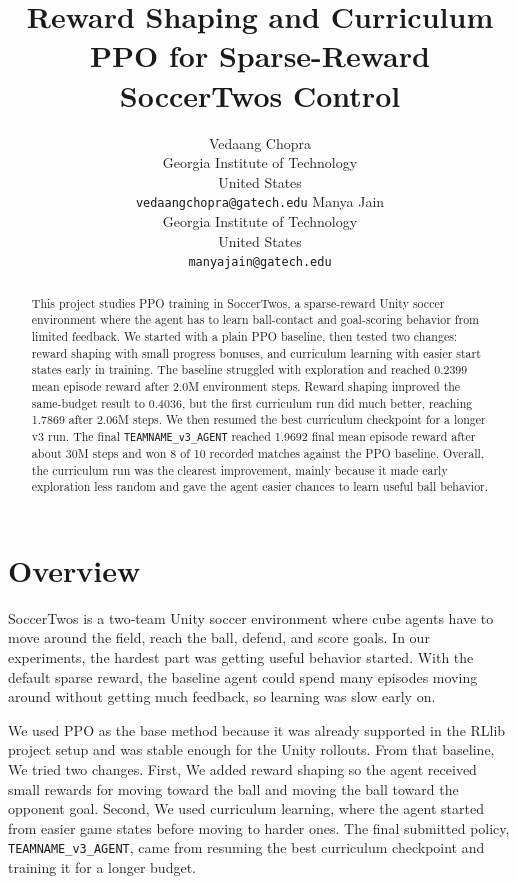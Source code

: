 \documentclass{article}
\title{Reward Shaping and Curriculum PPO for Sparse-Reward SoccerTwos Control}
\author{
  Vedaang Chopra\\
  Georgia Institute of Technology\\
  United States\\
  \texttt{vedaangchopra@gatech.edu}
  \And
  Manya Jain\\
  Georgia Institute of Technology\\
  United States\\
  \texttt{manyajain@gatech.edu}
}
\begin{document}
\maketitle


\begin{abstract}
This project studies PPO training in SoccerTwos, a sparse-reward Unity soccer environment where the agent has to learn ball-contact and goal-scoring behavior from limited feedback. We started with a plain PPO baseline, then tested two changes: reward shaping with small progress bonuses, and curriculum learning with easier start states early in training. The baseline struggled with exploration and reached 0.2399 mean episode reward after 2.0M environment steps. Reward shaping improved the same-budget result to 0.4036, but the first curriculum run did much better, reaching 1.7869 after 2.06M steps. We then resumed the best curriculum checkpoint for a longer v3 run. The final \texttt{TEAMNAME\_v3\_AGENT} reached 1.9692 final mean episode reward after about 30M steps and won 8 of 10 recorded matches against the PPO baseline. Overall, the curriculum run was the clearest improvement, mainly because it made early exploration less random and gave the agent easier chances to learn useful ball behavior.
\end{abstract}



\section{Overview}

SoccerTwos is a two-team Unity soccer environment where cube agents have to move around the field, reach the ball, defend, and score goals. In our experiments, the hardest part was getting useful behavior started. With the default sparse reward, the baseline agent could spend many episodes moving around without getting much feedback, so learning was slow early on.

We used PPO as the base method because it was already supported in the RLlib project setup and was stable enough for the Unity rollouts. From that baseline, We tried two changes. First, We added reward shaping so the agent received small rewards for moving toward the ball and moving the ball toward the opponent goal. Second, We used curriculum learning, where the agent started from easier game states before moving to harder ones. The final submitted policy, \texttt{TEAMNAME\_v3\_AGENT}, came from resuming the best curriculum checkpoint and training it for a longer budget.
\end{document}
